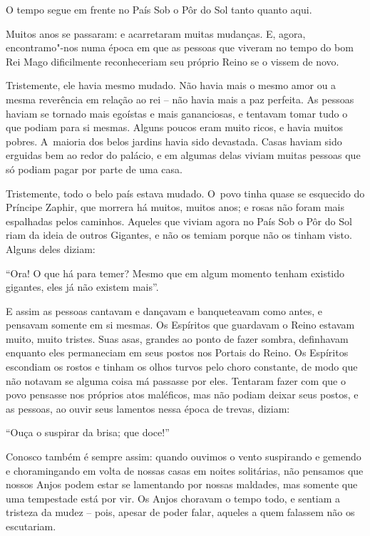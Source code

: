  

O tempo segue em frente no País Sob o Pôr do Sol tanto quanto aqui.

Muitos anos se passaram: e acarretaram muitas mudanças. E, agora,
encontramo"-nos numa época em que as pessoas que viveram no tempo do bom
Rei Mago dificilmente reconheceriam seu próprio Reino se o vissem de
novo.

Tristemente, ele havia mesmo mudado. Não havia mais o mesmo amor ou a
mesma reverência em relação ao rei -- não havia mais a paz perfeita. As
pessoas haviam se tornado mais egoístas e mais gananciosas, e tentavam
tomar tudo o que podiam para si mesmas. Alguns poucos eram muito ricos,
e havia muitos pobres. A~maioria dos belos jardins havia sido devastada.
Casas haviam sido erguidas bem ao redor do palácio, e em algumas delas
viviam muitas pessoas que só podiam pagar por parte de uma casa.

Tristemente, todo o belo país estava mudado. O~povo tinha quase se
esquecido do Príncipe Zaphir, que morrera há muitos, muitos anos; e
rosas não foram mais espalhadas pelos caminhos. Aqueles que viviam agora
no País Sob o Pôr do Sol riam da ideia de outros Gigantes, e não os
temiam porque não os tinham visto. Alguns deles diziam:

``Ora! O que há para temer? Mesmo que em algum momento tenham existido
gigantes, eles já não existem mais''.

E assim as pessoas cantavam e dançavam e banqueteavam como antes, e
pensavam somente em si mesmas. Os Espíritos que guardavam o Reino
estavam muito, muito tristes. Suas asas, grandes ao ponto de fazer
sombra, definhavam enquanto eles permaneciam em seus postos nos Portais
do Reino. Os Espíritos escondiam os rostos e tinham os olhos turvos pelo
choro constante, de modo que não notavam se alguma coisa má passasse
por eles. Tentaram fazer com que o povo pensasse nos próprios atos
maléficos, mas não podiam deixar seus postos, e as pessoas, ao ouvir
seus lamentos nessa época de trevas, diziam:

``Ouça o suspirar da brisa; que doce!''

Conosco também é sempre assim: quando ouvimos o vento suspirando e
gemendo e choramingando em volta de nossas casas em noites solitárias,
não pensamos que nossos Anjos podem estar se lamentando por nossas
maldades, mas somente que uma tempestade está por vir. Os Anjos choravam
o tempo todo, e sentiam a tristeza da mudez -- pois, apesar de poder
falar, aqueles a quem falassem não os escutariam.

